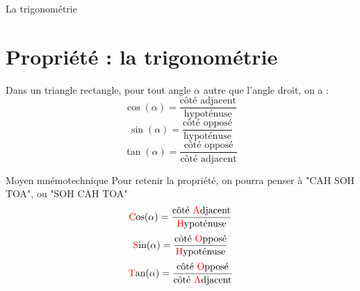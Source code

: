 \begin{frame}{La trigonométrie}
    \section{Propriété : la trigonométrie}
    Dans un triangle rectangle, pour tout angle $\alpha$ autre que l'angle droit, on a :
     $$\cos(\alpha) = \dfrac {\text{côté adjacent}}{\text{hypoténuse}}$$
    $$\sin(\alpha) = \dfrac {\text{côté opposé}}{\text{hypoténuse}}$$
    $$\tan(\alpha) = \dfrac {\text{côté opposé}}{\text{côté adjacent}}$$
\end{frame}

\begin{frame}{Moyen mnémotechnique}
    Pour retenir la propriété, on pourra penser à "CAH SOH TOA", ou "SOH CAH TOA"
     $$\text{\textcolor{red}{C}os}(\alpha) = \dfrac {\text{côté \textcolor{red}{A}djacent}}{\text{\textcolor{red}{H}ypoténuse}}$$
    $$\text{\textcolor{red}{S}in}(\alpha) = \dfrac {\text{côté \textcolor{red}{O}pposé}}{\text{\textcolor{red}{H}ypoténuse}}$$
    $$\text{\textcolor{red}{T}an}(\alpha) = \dfrac {\text{côté \textcolor{red}{O}pposé}}{\text{côté \textcolor{red}{A}djacent}}$$
\end{frame}



